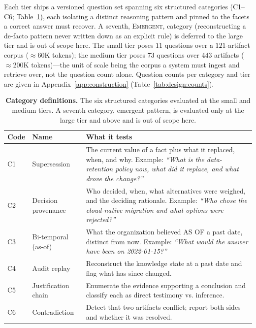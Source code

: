 {\sloppy
Each tier ships a versioned question set spanning six structured categories
(C1--C6; Table~\ref{tab:categories}), each isolating a distinct reasoning pattern
and pinned to the facets a correct answer must recover. A seventh,
\textsc{Emergent}, category (reconstructing a de-facto pattern never written down
as an explicit rule) is deferred to the large tier and is out of scope here. The
small tier poses $11$ questions over a $121$-artifact corpus ($\approx$60K
tokens); the medium tier poses $73$ questions over $443$ artifacts
($\approx$200K tokens)---the unit of scale being the corpus a system must ingest
and retrieve over, not the question count alone. Question counts per category and
tier are given in Appendix~\ref{app:construction}
(Table~\ref{tab:design:counts}).
\par}

\begin{table}[t]
  \centering
  \caption{\textbf{Category definitions.} The six structured categories
    evaluated at the small and medium tiers. A seventh category, emergent
    pattern, is evaluated only at the large tier and above and is out of scope
    here.}
  \label{tab:categories}
  \begin{tabular}{l l p{}}
    \toprule
    Code & Name & What it tests \\
    \midrule
    C1 & Supersession        & The current value of a fact plus what it
                               replaced, when, and why. Example: \emph{``What is
                               the data-retention policy now, what did it
                               replace, and what drove the change?''} \\
    C2 & Decision provenance & Who decided, when, what alternatives were
                               weighed, and the deciding rationale. Example:
                               \emph{``Who chose the cloud-native migration and
                               what options were rejected?''} \\
    C3 & Bi-temporal (as-of) & What the organization believed AS OF a past date,
                               distinct from now. Example: \emph{``What would the
                               answer have been on 2022-01-15?''} \\
    C4 & Audit replay        & Reconstruct the knowledge state at a past date and
                               flag what has since changed. \\
    C5 & Justification chain & Enumerate the evidence supporting a conclusion and
                               classify each as direct testimony vs. inference. \\
    C6 & Contradiction       & Detect that two artifacts conflict; report both
                               sides and whether it was resolved. \\
    \bottomrule
  \end{tabular}
\end{table}

